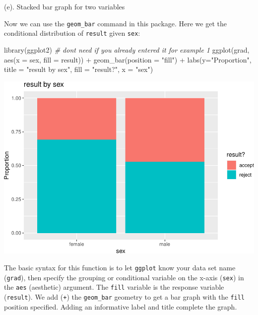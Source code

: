 \documentclass[
]{book}
\newenvironment{Shaded}{\begin{snugshade}}{\end{snugshade}}
\newcommand{\AttributeTok}[1]{\textcolor[rgb]{0.77,0.63,0.00}{#1}}
\newcommand{\CommentTok}[1]{\textcolor[rgb]{0.56,0.35,0.01}{\textit{#1}}}
\newcommand{\FunctionTok}[1]{\textcolor[rgb]{0.00,0.00,0.00}{#1}}
\newcommand{\NormalTok}[1]{#1}
\newcommand{\SpecialCharTok}[1]{\textcolor[rgb]{0.00,0.00,0.00}{#1}}
\newcommand{\StringTok}[1]{\textcolor[rgb]{0.31,0.60,0.02}{#1}}
\begin{document}
(e). Stacked bar graph for two variables

Now we can use the \texttt{geom\_bar} command in this package. Here we get the conditional distribution of \texttt{result} given \texttt{sex}:

\begin{Shaded}
\begin{Highlighting}[]
\FunctionTok{library}\NormalTok{(ggplot2) }\CommentTok{\# don\textquotesingle{}t need if you already entered it for example 1}
\FunctionTok{ggplot}\NormalTok{(grad, }\FunctionTok{aes}\NormalTok{(}\AttributeTok{x =}\NormalTok{ sex, }\AttributeTok{fill =}\NormalTok{ result)) }\SpecialCharTok{+} 
  \FunctionTok{geom\_bar}\NormalTok{(}\AttributeTok{position =} \StringTok{"fill"}\NormalTok{) }\SpecialCharTok{+} 
  \FunctionTok{labs}\NormalTok{(}\AttributeTok{y=}\StringTok{"Proportion"}\NormalTok{, }\AttributeTok{title =} \StringTok{"result by sex"}\NormalTok{, }\AttributeTok{fill =} \StringTok{"result?"}\NormalTok{, }\AttributeTok{x =} \StringTok{"sex"}\NormalTok{)}
\end{Highlighting}
\end{Shaded}

\includegraphics[width=1\linewidth]{Class_Activity_4_files/figure-latex/unnamed-chunk-28-1}

The basic syntax for this function is to let \texttt{ggplot} know your data set name (\texttt{grad}), then specify the grouping or conditional variable on the x-axis (\texttt{sex}) in the \texttt{aes} (aesthetic) argument. The \texttt{fill} variable is the response variable (\texttt{result}). We add (\texttt{+}) the \texttt{geom\_bar} geometry to get a bar graph with the \texttt{fill} position specified. Adding an informative label and title complete the graph.
\end{document}
